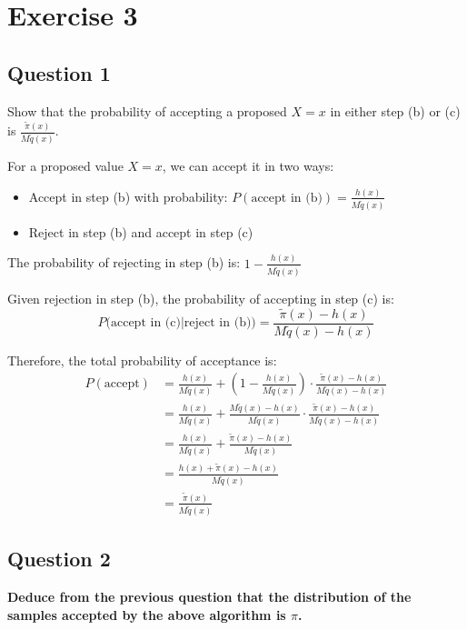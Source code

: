 \section*{Exercise 3}

\subsection*{Question 1}
Show that the probability of accepting a proposed $X = x$ in either step (b) or (c) 
is $\frac{\tilde{\pi}(x)}{M\tilde{q}(x)}$.

For a proposed value $X = x$, we can accept it in two ways:
\begin{itemize}
\item Accept in step (b) with probability: $P(\text{accept in (b)}) = \frac{h(x)}{M\tilde{q}(x)}$
\item Reject in step (b) and accept in step (c)
\end{itemize}

The probability of rejecting in step (b) is: $1 - \frac{h(x)}{M\tilde{q}(x)}$

Given rejection in step (b), the probability of accepting in step (c) is:
$$P\Big(\text{accept in (c)} \Big\vert \text{reject in (b)}\Big) = \frac{\tilde{\pi}(x) - h(x)}{M\tilde{q}(x) - h(x)}$$

Therefore, the total probability of acceptance is:
\begin{align*}
P(\text{accept}) &= \frac{h(x)}{M\tilde{q}(x)} + \left(1 - \frac{h(x)}{M\tilde{q}(x)}\right) \cdot \frac{\tilde{\pi}(x) - h(x)}{M\tilde{q}(x) - h(x)}\\
&= \frac{h(x)}{M\tilde{q}(x)} + \frac{M\tilde{q}(x) - h(x)}{M\tilde{q}(x)} \cdot \frac{\tilde{\pi}(x) - h(x)}{M\tilde{q}(x) - h(x)}\\
&= \frac{h(x)}{M\tilde{q}(x)} + \frac{\tilde{\pi}(x) - h(x)}{M\tilde{q}(x)}\\
&= \frac{h(x) + \tilde{\pi}(x) - h(x)}{M\tilde{q}(x)} \\
&= \frac{\tilde{\pi}(x)}{M\tilde{q}(x)}
\end{align*}


\subsection*{Question 2}
\textbf{Deduce from the previous question that the distribution of the samples accepted by the above algorithm is $\pi$.}

